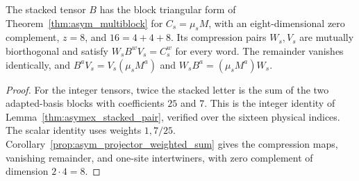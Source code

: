 \begin{lemma}
    \label{thm:asymex_one_label_compression}
    \leanok
    The stacked tensor $B$ has the block triangular form of
    Theorem~\ref{thm:asym_multiblock} for $C_s=\mu_sM$, with an
    eight-dimensional zero complement, $z=8$, and $16=4+4+8$.
    Its compression pairs $W_s,V_s$ are mutually biorthogonal and
    satisfy $W_sB^wV_s=C_s^w$ for every word.
    The remainder vanishes identically, and
    $B^aV_s=V_s(\mu_sM^a)$ and $W_sB^a=(\mu_sM^a)W_s$.
\end{lemma}
\begin{proof}
    \leanok
    For the integer tensors, twice the stacked letter is the sum
    of the two adapted-basis blocks with coefficients $25$ and $7$.
    This is the integer identity of
    Lemma~\ref{thm:asymex_stacked_pair}, verified over the sixteen
    physical indices. The scalar identity uses weights $1,7/25$.
    Corollary~\ref{prop:asym_projector_weighted_sum} gives the
    compression maps, vanishing remainder, and one-site intertwiners,
    with zero complement of dimension $2\cdot4=8$.
\end{proof}

